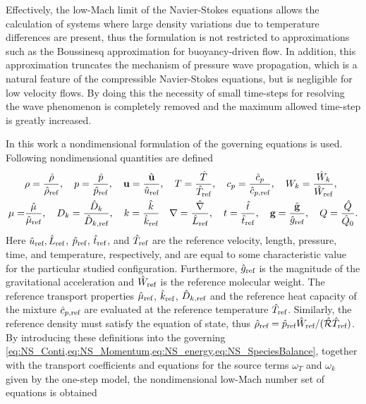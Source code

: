 Effectively, the low-Mach limit of the Navier-Stokes equations allows the calculation of systems where large density variations due to temperature differences are present, thus the formulation is not restricted to approximations such as the Boussinesq approximation for buoyancy-driven flow. In addition, this approximation truncates the mechanism of pressure wave propagation, which is a natural feature of the compressible Navier-Stokes equations, but is negligible for low velocity flows. By doing this the necessity of small time-steps for resolving the wave phenomenon is completely removed and the maximum allowed time-step is greatly increased.

In this work a nondimensional formulation of the governing equations is used. Following nondimensional quantities are defined
\begin{align*}
	      & \rho = \frac{\hat \rho}{\hat \rho_{\text{ref}}}, \quad
	p = \frac{\hat p}{\hat p_{\text{ref}}}, \quad
	\textbf{u}= \frac{\hat{\textbf{u}}}{\hat u_{\text{ref}}}, \quad
	T = \frac{\hat T}{\hat T_{\text{ref}}},  \quad
	c_p = \frac{\hat c_p}{\hat c_{p,\text{ref}}}, \quad
	W_k = \frac{\hat{W}_k}{\hat W_{\text{ref}}},
	\\
	\mu = & \frac{\hat \mu}{\hat \mu_{\text{ref}}},\quad
	D_k = \frac{\hat D_k}{\hat D_{k,\text{ref}}}, \quad
	k = \frac{\hat k}{\hat k_{\text{ref}}}\quad
	\nabla = \frac{\hat \nabla}{\hat L_{\text{ref}}}, \quad
	t = \frac{\hat{t}}{\hat t_{\text{ref}}},\quad
	\textbf{g} = \frac{\hat{\textbf{g}}}{\hat g_{\text{ref}}},\quad
	Q = \frac{\hat Q}{\hat{Q}_0}.
\end{align*}
Here $\hat u_{\text{ref}}, \hat L_{\text{ref}}$, $\hat p_{\text{ref}}$, $\hat t_{\text{ref}}$, and $\hat T_{\text{ref}}$ are the reference velocity, length, pressure, time, and temperature, respectively, and are equal to some characteristic value for the particular studied configuration. Furthermore, $\hat g_{\text{ref}}$ is the magnitude of the gravitational acceleration and $\hat W_{\text{ref}}$ is the reference molecular weight. The reference transport properties $\hat \mu_{\text{ref}}$, $\hat k_{\text{ref}}$, $\hat D_{k,\text{ref}}$ and the reference heat capacity of the mixture $\hat c_{p,\text{ref}}$ are evaluated at the reference temperature $\hat T_{\text{ref}}$. Similarly, the reference density must satisfy the equation of state, thus $\hat \rho_{\text{ref}} = \hat p_{\text{ref}}\hat W_{\text{ref}}/(\hat{\mathcal{R}}\hat T_{\text{ref}})$.  By introducing these definitions into the governing  \cref{eq:NS_Conti,eq:NS_Momentum,eq:NS_energy,eq:NS_SpeciesBalance}, together with the transport coefficients and equations for the source terms $\omega_T$ and $\omega_k$ given by the one-step model, the nondimensional low-Mach number set of equations is obtained
